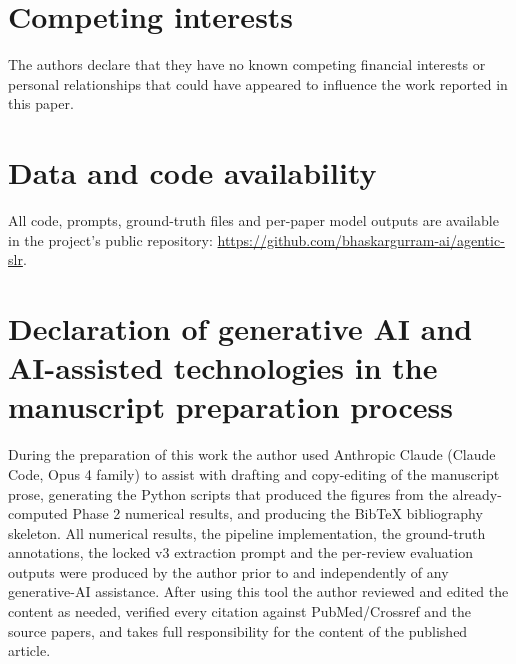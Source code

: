 \documentclass[a4paper,fleqn]{cas-sc}
\begin{document}
\section*{Competing interests}
The authors declare that they have no known competing financial interests
or personal relationships that could have appeared to influence the work
reported in this paper.

\section*{Data and code availability}
All code, prompts, ground-truth files and per-paper model outputs are
available in the project's public repository:
\url{https://github.com/bhaskargurram-ai/agentic-slr}.

\section*{Declaration of generative AI and AI-assisted technologies in
the manuscript preparation process}

During the preparation of this work the author used Anthropic Claude
(Claude Code, Opus 4 family) to assist with drafting and copy-editing
of the manuscript prose, generating the Python scripts that produced
the figures from the already-computed Phase 2 numerical results, and
producing the BibTeX bibliography skeleton. All numerical results,
the pipeline implementation, the ground-truth annotations, the locked
v3 extraction prompt and the per-review evaluation outputs were
produced by the author prior to and independently of any
generative-AI assistance. After using this tool the author reviewed
and edited the content as needed, verified every citation against
PubMed/Crossref and the source papers, and takes full responsibility
for the content of the published article.




\appendix
\end{document}
